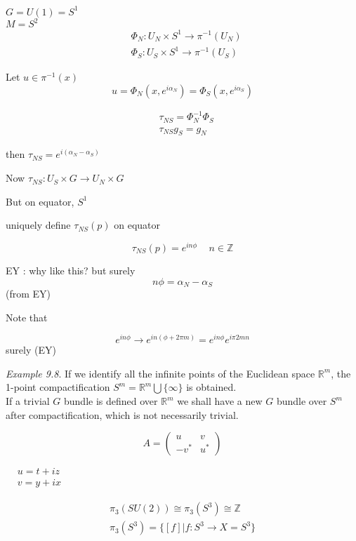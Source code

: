 \documentclass{book}
\begin{document}
$G = U(1) = S^1$ \\
$M=S^2$ \\

\[
\begin{aligned}
  & \Phi_N : U_N \times S^1 \to \pi^{-1}{ (U_N) } \\ 
  & \Phi_S : U_S \times S^1 \to \pi^{-1}{ (U_S) } 
\end{aligned}
\]

Let $u\in \pi^{-1}{ (x)}$ 
\[
u = \Phi_N(x,e^{i \alpha_N} ) = \Phi_S( x, e^{ i \alpha_S } )
\]

\[
\begin{aligned}
  & \tau_{NS} = \Phi_N^{-1} \Phi_S \\ 
  & \tau_{NS}g_S = g_N
\end{aligned}
\]

then $\tau_{NS} = e^{ i (\alpha_N - \alpha_S)}$

Now $\tau_{NS}: U_S \times G \to U_N \times G$  

But on equator, $S^1$

uniquely define $\tau_{NS}(p)$ on equator 

\[
\tau_{NS}(p) = e^{i n \phi } \quad \, n \in \mathbb{Z}
\]

EY : why like this? but surely
\[
n\phi = \alpha_N - \alpha_S 
\]
(from EY)

Note that 

\[
e^{in\phi}  \to e^{ i n (\phi + 2 \pi m ) } = e^{in \phi } e^{i \pi 2mn }
\]
surely (EY)


\emph{Example 9.8}. If we identify all the infinite points of the Euclidean space $\mathbb{R}^m$, the 1-point compactification $S^m = \mathbb{R}^m \bigcup \lbrace \infty \rbrace$ is obtained.  \\
If a trivial $G$ bundle is defined over $\mathbb{R}^m$ we shall have a new $G$ bundle over $S^m$ after compactification, which is not necessarily trivial.  


\[
A = \left( \begin{matrix} u & v \\ 
  -v^* & u^* \end{matrix} \right)
\]

$\begin{aligned}
  & u = t+iz \\
  & v = y + ix \end{aligned}$

\[
\begin{gathered}
  \pi_3(SU(2)) \cong \pi_3(S^3) \cong \mathbb{Z} \\ 
  \pi_3(S^3) = \lbrace [f] | f: S^3 \to X = S^3 \rbrace
\end{gathered}
\]
\end{document}
